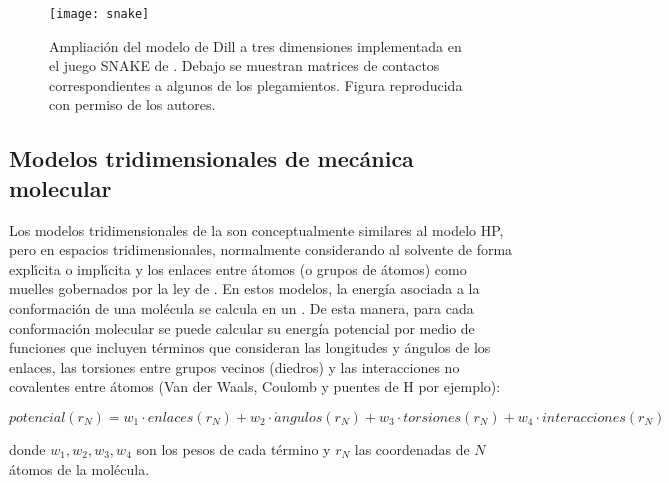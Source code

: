 \begin{figure}
\begin{center} 
\texttt{[image: snake]}
\caption%
{
Ampliaci\'{o}n del modelo de Dill a tres dimensiones implementada en el juego SNAKE de \citet{Nido2016}.
Debajo se muestran matrices de contactos correspondientes a algunos de los plegamientos. 
Figura reproducida con permiso de los autores.
}
\label{fig:snakefold}
\end{center}
\end{figure}


\subsection{Modelos tridimensionales de mec\'{a}nica molecular} \label{DM}

Los modelos tridimensionales de la 
son conceptualmente similares al modelo HP, pero en espacios tridimensionales, normalmente considerando al solvente de forma 
expl\'\i{}cita o impl\'\i{}cita y los enlaces entre \'{a}tomos (o grupos de \'{a}tomos) como muelles gobernados por la ley de 
. En estos modelos, la energ\'{i}a asociada 
a la conformaci\'{o}n
de una mol\'{e}cula se calcula en un .
De esta manera, para cada conformaci\'{o}n molecular se puede calcular su energ\'{i}a potencial por medio de funciones que 
incluyen t\'{e}rminos que consideran las longitudes y \'{a}ngulos de los enlaces, 
las torsiones entre grupos vecinos (diedros) y las interacciones no covalentes entre \'{a}tomos (Van der Waals, Coulomb y puentes de H por ejemplo):

\begin{equation}
potencial(r_{N}) = w_{1} \cdot enlaces(r_{N}) + w_{2} \cdot \acute{a}ngulos(r_{N}) + w_{3} \cdot torsiones(r_{N}) + w_{4} \cdot interacciones(r_{N})
\label{eq:PnR}
\end{equation} 

donde $w_{1},w_{2},w_{3},w_{4}$ son los pesos de cada t\'{e}rmino y 
$r_{N}$ las coordenadas de $N$ \'{a}tomos de la mol\'{e}cula. 

